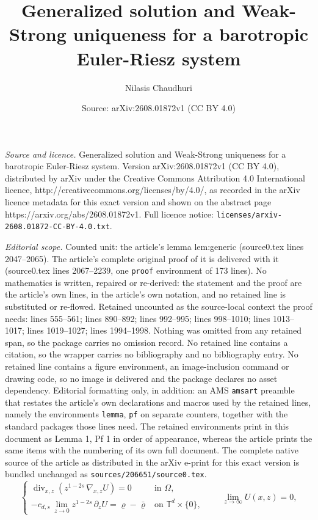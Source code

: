 \documentclass[10pt,a4paper]{amsart}
\title{Generalized solution and Weak-Strong uniqueness for a barotropic Euler-Riesz system}
\author{Nilasis Chaudhuri}
\date{Source: arXiv:2608.01872v1 (CC BY 4.0)}
\newcommand{\Div}{\operatorname{div}}
\newcommand{\Grad}{\nabla}
\newcommand{\vr}{\varrho}
\begin{document}
\maketitle

\noindent\emph{Source and licence.} Generalized solution and Weak-Strong uniqueness for a barotropic Euler-Riesz system. Version arXiv:2608.01872v1 (CC BY 4.0), distributed by arXiv under the Creative Commons Attribution 4.0 International licence, http://creativecommons.org/licenses/by/4.0/, as recorded in the arXiv licence metadata for this exact version and shown on the abstract page https://arxiv.org/abs/2608.01872v1. Full licence notice: \texttt{licenses/arxiv-2608.01872-CC-BY-4.0.txt}.\par\smallskip

\noindent\textit{Editorial scope.} Counted unit: the article's lemma lem:generic (source0.tex lines 2047--2065). The article's complete original proof of it is delivered with it (source0.tex lines 2067--2239, one \texttt{proof} environment of 173 lines). No mathematics is written, repaired or re-derived: the statement and the proof are the article's own lines, in the article's own notation, and no retained line is substituted or re-flowed.  Retained uncounted as the source-local context the proof needs: lines 555--561; lines 890--892; lines 992--995; lines 998--1010; lines 1013--1017; lines 1019--1027; lines 1994--1998.  Nothing was omitted from any retained span, so the package carries no omission record.  No retained line contains a citation, so the wrapper carries no bibliography and no bibliography entry.  No retained line contains a figure environment, an image-inclusion command or drawing code, so no image is delivered and the package declares no asset dependency.  Editorial formatting only, in addition: an AMS \texttt{amsart} preamble that restates the article's own declarations and macros used by the retained lines, namely the environments \texttt{lemma}, \texttt{pf} on separate counters, together with the standard packages those lines need.  The retained environments print in this document as Lemma 1, Pf 1 in order of appearance, whereas the article prints the same items with the numbering of its own full document.  The complete native source of the article as distributed in the arXiv e-print for this exact version is bundled unchanged as \texttt{sources/206651/source0.tex}.
	\begin{equation}\label{CS-ext}
		\begin{cases}
			\Div_{x,z}\!\left( z^{1-2s}\,\Grad_{x,z} U \right) = 0 & \text{in } \Omega,\\[2pt]
			-c_{d,s}\,\displaystyle\lim_{z\to 0} z^{1-2s}\,\partial_z U = \vr - \bar\vr & \text{on } \mathbb{T}^d\times\{0\},
		\end{cases}
		\qquad \lim_{z\to\infty} U(x,z) = 0,
	\end{equation}
\end{document}
